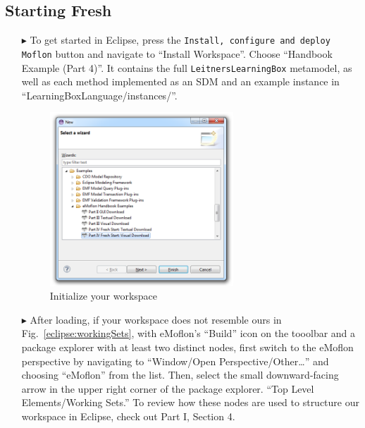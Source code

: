 \subsection{Starting Fresh}
\label{sec:loadSourceMeta}
\begin{itemize}

\item[$\blacktriangleright$] To get started in Eclipse, press the \texttt{Install, configure and deploy Moflon} button and navigate to ``Install Workspace''. Choose ``Handbook Example (Part 4)''. It contains the full \texttt{LeitnersLearningBox} metamodel, as well as each method implemented as an SDM and an example instance in ``LearningBoxLanguage/instances/''.

\begin{figure}[htbp]
\begin{center}
  \includegraphics[width=0.65\textwidth]{eclipse_part4FreshWizardDownload}
  \caption{Initialize your workspace}
  \label{eclipse:downPartIV}
\end{center}
\end{figure}

\vspace{0.5cm}

\item[$\blacktriangleright$] After loading, if your workspace does not resemble ours in Fig.~\ref{eclipse:workingSets}, with eMoflon's ``Build'' icon on the
tooolbar and a package explorer with at least two distinct nodes, first switch to the eMoflon perspective by navigating to ``Window/Open
Perspective/Other\ldots'' and choosing ``eMoflon'' from the list. Then, select the small downward-facing arrow in the upper right corner of the package
explorer. ``Top Level Elements/Working Sets.'' To review how these nodes are used to structure our workspace in Eclipse, check out Part I, Section 4.


\end{itemize}

